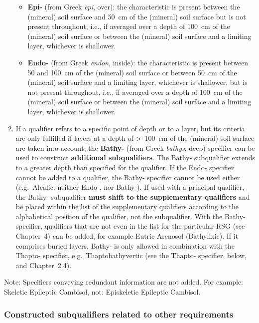 \documentclass[
  letterpaper,
  DIV=11,
  numbers=noendperiod]{scrreprt}
\providecommand{\tightlist}{%
  \setlength{\itemsep}{0pt}\setlength{\parskip}{0pt}}\usepackage{longtable,booktabs,array}
\begin{document}
\begin{enumerate}
  \begin{itemize}
  \tightlist
  \item
    \textbf{Epi-} (from Greek \emph{epi}, over): the characteristic is
    present between the (mineral) soil surface and 50~cm of the
    (mineral) soil surface but is not present throughout, i.e., if
    averaged over a depth of 100~cm of the (mineral) soil surface or
    between the (mineral) soil surface and a limiting layer, whichever
    is shallower.
  \item
    \textbf{Endo-} (from Greek \emph{endon}, inside): the characteristic
    is present between 50 and 100~cm of the (mineral) soil surface or
    between 50~cm of the (mineral) soil surface and a limiting layer,
    whichever is shallower, but is not present throughout, i.e., if
    averaged over a depth of 100~cm of the (mineral) soil surface or
    between the (mineral) soil surface and a limiting layer, whichever
    is shallower.
  \end{itemize}
\item
  If a qualifier refers to a specific point of depth or to a layer, but
  its criteria are only fulfilled if layers at a depth of
  \textgreater~100~cm of the (mineral) soil surface are taken into
  account, the \textbf{Bathy-} (from Greek \emph{bathys}, deep)
  specifier can be used to construct \textbf{additional subqualifiers}.
  The Bathy- subqualifier extends to a greater depth than specified for
  the qualifier. If the Endo- specifier cannot be added to a qualifier,
  the Bathy- specifier cannot be used either (e.g.~Alcalic: neither
  Endo-, nor Bathy-). If used with a principal qualifier, the Bathy-
  subqualifier \textbf{must shift to the supplementary qualifiers} and
  be placed within the list of the supplementary qualifiers according to
  the alphabetical position of the qualifier, not the subqualifier. With
  the Bathy- specifier, qualifiers that are not even in the list for the
  particular RSG (see Chapter~4) can be added, for example Eutric
  Arenosol (Bathylixic). If it comprises buried layers, Bathy- is only
  allowed in combination with the Thapto- specifier,
  e.g.~Thaptobathyvertic (see the Thapto- specifier, below, and
  Chapter~2.4).
\end{enumerate}

Note: Specifiers conveying redundant information are not added. For
example: Skeletic Epileptic Cambisol, not: Episkeletic Epileptic
Cambisol.

\hypertarget{constructed-subqualifiers-related-to-other-requirements}{%
\subsubsection{Constructed subqualifiers related to other
requirements}\label{constructed-subqualifiers-related-to-other-requirements}}
\end{document}
